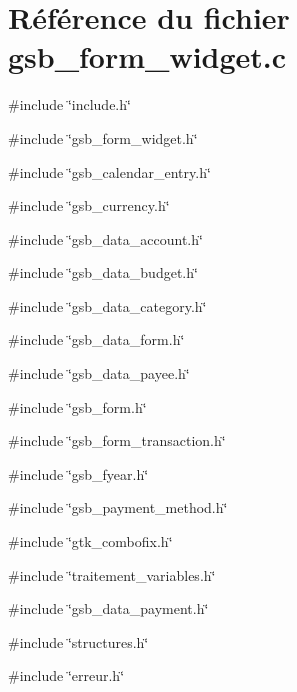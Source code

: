 \section{Référence du fichier gsb\_\-form\_\-widget.c}
\label{gsb__form__widget_8c}
{\ttfamily \#include \char`\"{}include.h\char`\"{}}\par
{\ttfamily \#include \char`\"{}gsb\_\-form\_\-widget.h\char`\"{}}\par
{\ttfamily \#include \char`\"{}gsb\_\-calendar\_\-entry.h\char`\"{}}\par
{\ttfamily \#include \char`\"{}gsb\_\-currency.h\char`\"{}}\par
{\ttfamily \#include \char`\"{}gsb\_\-data\_\-account.h\char`\"{}}\par
{\ttfamily \#include \char`\"{}gsb\_\-data\_\-budget.h\char`\"{}}\par
{\ttfamily \#include \char`\"{}gsb\_\-data\_\-category.h\char`\"{}}\par
{\ttfamily \#include \char`\"{}gsb\_\-data\_\-form.h\char`\"{}}\par
{\ttfamily \#include \char`\"{}gsb\_\-data\_\-payee.h\char`\"{}}\par
{\ttfamily \#include \char`\"{}gsb\_\-form.h\char`\"{}}\par
{\ttfamily \#include \char`\"{}gsb\_\-form\_\-transaction.h\char`\"{}}\par
{\ttfamily \#include \char`\"{}gsb\_\-fyear.h\char`\"{}}\par
{\ttfamily \#include \char`\"{}gsb\_\-payment\_\-method.h\char`\"{}}\par
{\ttfamily \#include \char`\"{}gtk\_\-combofix.h\char`\"{}}\par
{\ttfamily \#include \char`\"{}traitement\_\-variables.h\char`\"{}}\par
{\ttfamily \#include \char`\"{}gsb\_\-data\_\-payment.h\char`\"{}}\par
{\ttfamily \#include \char`\"{}structures.h\char`\"{}}\par
{\ttfamily \#include \char`\"{}erreur.h\char`\"{}}\par
